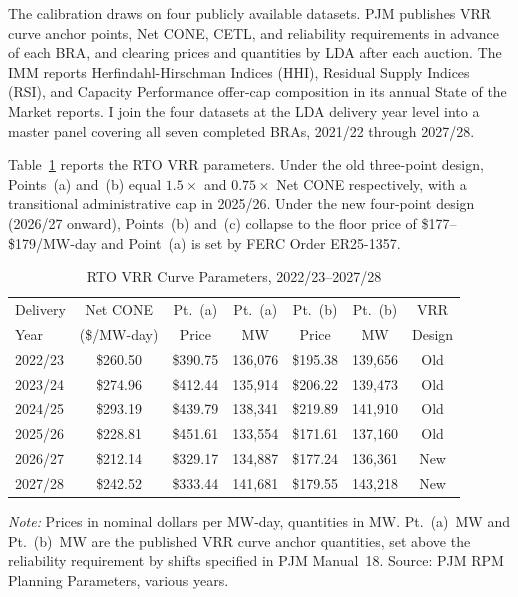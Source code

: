 
\label{sec:calibration}

The calibration draws on four publicly available datasets. PJM publishes
VRR curve anchor points, Net CONE, CETL, and reliability requirements
in advance of each BRA, and clearing prices and quantities by LDA after
each auction. The IMM reports Herfindahl-Hirschman Indices (HHI), Residual
Supply Indices (RSI), and Capacity Performance offer-cap composition in its
annual State of the Market reports. I join the four datasets at the
LDA delivery year level into a master panel covering all seven completed
BRAs, 2021/22 through 2027/28.

Table~\ref{tab:vrr_params} reports the RTO VRR parameters. Under the old
three-point design, Points~(a) and~(b) equal $1.5 \times$ and
$0.75 \times$ Net CONE respectively, with a transitional administrative
cap in 2025/26. Under the new four-point design (2026/27 onward),
Points~(b) and~(c) collapse to the floor price of \$177--\$179/MW-day
and Point~(a) is set by FERC Order ER25-1357.

\begin{table}[H]
  \centering
  \caption{RTO VRR Curve Parameters, 2022/23--2027/28}
  \label{tab:vrr_params}
  \begin{tabular}{lcccccc}
    \toprule
    Delivery & Net CONE    & Pt.~(a) & Pt.~(a) & Pt.~(b) & Pt.~(b) & VRR  \\
    Year     & (\$/MW-day) & Price   & MW      & Price   & MW      & Design \\
    \midrule
    2022/23 & \$260.50 & \$390.75 & 136{,}076 & \$195.38 & 139{,}656 & Old \\
    2023/24 & \$274.96 & \$412.44 & 135{,}914 & \$206.22 & 139{,}473 & Old \\
    2024/25 & \$293.19 & \$439.79 & 138{,}341 & \$219.89 & 141{,}910 & Old \\
    2025/26 & \$228.81 & \$451.61 & 133{,}554 & \$171.61 & 137{,}160 & Old \\
    2026/27 & \$212.14 & \$329.17 & 134{,}887 & \$177.24 & 136{,}361 & New \\
    2027/28 & \$242.52 & \$333.44 & 141{,}681 & \$179.55 & 143{,}218 & New \\
    \bottomrule
  \end{tabular}
  \vspace{3pt}

  \begin{minipage}{0.92\textwidth}
    \footnotesize \textit{Note:} Prices in nominal dollars per MW-day,
    quantities in MW. Pt.~(a)~MW and Pt.~(b)~MW are the published
    VRR curve anchor quantities, set above the reliability requirement
    by shifts specified in PJM Manual~18. Source: PJM RPM Planning
    Parameters, various years.
  \end{minipage}
\end{table}

